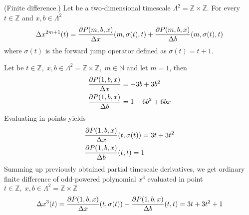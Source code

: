 \begin{cor}
    \label{finite_difference_case}
    (Finite difference.)
    Let be a two-dimensional timescale
    $\Lambda^2 = \mathbb{Z} \times \mathbb{Z}$.
    For every $t\in\mathbb{Z}$ and $x,b\in \Lambda^2$
    \begin{align*}
        \Delta x^{2m+1} (t)
        = \frac{\partial P ( m, b, x )}{\Delta x} (m, \sigma(t), t)
        + \frac{\partial P ( m, b, x )}{\Delta b}(m, \sigma(t), t)
    \end{align*}
    where $\sigma(t)$ is the forward jump operator defined as $\sigma(t) = t+1$.
\end{cor}
\begin{examp}
    \label{time_scale_z_example_1}
    Let be $t \in \mathbb{Z}, \; x,b \in \Lambda^2 = \mathbb{Z} \times \mathbb{Z}, \; m\in\mathbb{N}$ and let $m=1$, then
    \begin{align*}
        &\frac{\partial P ( 1, b, x )}{\Delta x}                = -3 b + 3 b^2 \\
        &\frac{\partial P ( 1, b, x )}{\Delta b}                = 1 - 6 b^2 + 6 b x
    \end{align*}
    Evaluating in points yields
    \begin{align*}
        &\frac{\partial P ( 1, b, x )}{\Delta x} (t, \sigma(t)) = 3 t + 3 t^2 \\
        &\frac{\partial P ( 1, b, x )}{\Delta b}(t,t)           = 1
    \end{align*}
    Summing up previously obtained partial timescale derivatives, we get ordinary finite difference of odd-powered polynomial
    $x^{3}$ evaluated in point $ t\in\mathbb{Z}, \; x,b\in\Lambda^2 = \mathbb{Z} \times \mathbb{Z}$
    \begin{align*}
        \Delta x^{3}(t)
        = \frac{\partial P ( 1, b, x )}{\Delta x} (t, \sigma(t))
        + \frac{\partial P ( 1, b, x )}{\Delta b}(t,t)
        = 3 t + 3 t^2 + 1
    \end{align*}
\end{examp}
